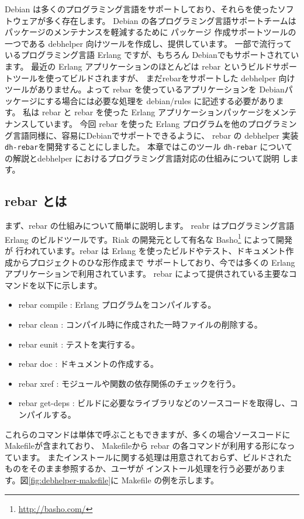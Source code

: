 \documentclass[mingoth,a4paper,twoside]{jsarticle}
\begin{document}
Debian は多くのプログラミング言語をサポートしており、それらを使ったソフトウェアが多く存在します。
Debian の各プログラミング言語サポートチームはパッケージのメンテナンスを軽減するために パッケージ
作成サポートツールの一つである debhelper 向けツールを作成し、提供しています。
一部で流行っているプログラミング言語 Erlang ですが、もちろん Debianでもサポートされています。
最近の Erlang アプリケーションのほとんどは rebar というビルドサポートツールを使ってビルドされますが、
まだrebarをサポートした debhelper 向けツールがありません。よって rebar を使っているアプリケーションを
Debianパッケージにする場合には必要な処理を debian/rules に記述する必要があります。
私は rebar と rebar を使った Erlang アプリケーションパッケージをメンテナンスしています。
今回 rebar を使った Erlang プログラムを他のプログラミング言語同様に、容易にDebianでサポートできるように、
rebar の debhelper 実装\texttt{dh-rebar}を開発することにしました。
本章ではこのツール \texttt{dh-rebar} についての解説とdebhelper におけるプログラミング言語対応の仕組みについて説明
します。

\subsection{rebar とは}

まず、rebar の仕組みについて簡単に説明します。
reabr はプログラミング言語 Erlang のビルドツールです。Riak の開発元として有名な
Basho\footnote{\url{http://basho.com/}} によって開発が
行われています。rebar は Erlang を使ったビルドやテスト、ドキュメント作成からプロジェクトのひな形作成まで
サポートしており、今では多くの Erlang アプリケーションで利用されています。
rebar によって提供されている主要なコマンドを以下に示します。

\begin{itemize}
\item rebar compile : Erlang プログラムをコンパイルする。
\item rebar clean : コンパイル時に作成された一時ファイルの削除する。
\item rebar eunit : テストを実行する。
\item rebar doc : ドキュメントの作成する。
\item rebar xref : モジュールや関数の依存関係のチェックを行う。
\item rebar get-deps : ビルドに必要なライブラリなどのソースコードを取得し、コンパイルする。
\end{itemize}

これらのコマンドは単体で呼ぶこともできますが、多くの場合ソースコードにMakefileが含まれており、
Makefileから rebar の各コマンドが利用する形になっています。
またインストールに関する処理は用意されておらず、ビルドされたものをそのまま参照するか、ユーザが
インストール処理を行う必要があります。図\ref{fig:debhelper-makefile}に Makefile の例を示します。
\end{document}
